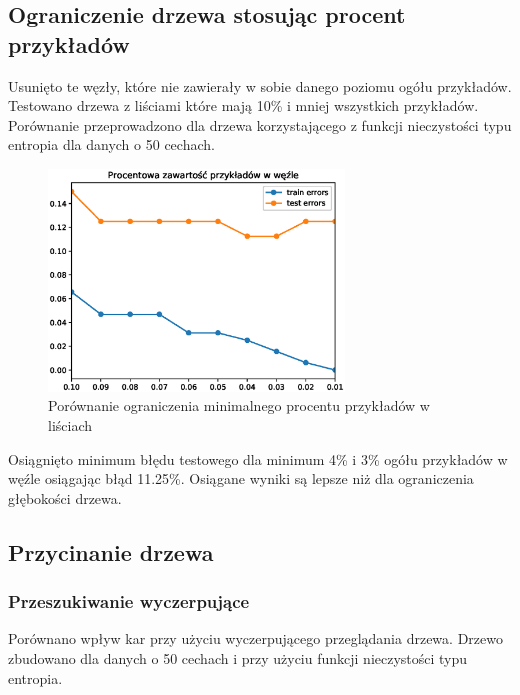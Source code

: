 \documentclass[11pt]{article}
\begin{document}
\subsection{Ograniczenie drzewa stosując procent przykładów}

Usunięto te węzły, które nie zawierały w sobie danego poziomu ogółu przykładów. Testowano drzewa z liściami które mają 10\% i mniej wszystkich przykładów. Porównanie przeprowadzono dla drzewa korzystającego z funkcji nieczystości typu entropia dla danych o 50 cechach.

\begin{figure}[H]
\center
\includegraphics[width=0.7\textwidth]{min_node_vals_test}
\caption{Porównanie ograniczenia minimalnego procentu przykładów w liściach}
\end{figure}

Osiągnięto minimum błędu testowego dla minimum 4\% i 3\% ogółu przykładów w węźle osiągając błąd 11.25\%. Osiągane wyniki są lepsze niż dla ograniczenia głębokości drzewa.

\subsection{Przycinanie drzewa}
\subsubsection{Przeszukiwanie wyczerpujące}

Porównano wpływ kar przy użyciu wyczerpującego przeglądania drzewa. Drzewo zbudowano dla danych o 50 cechach i przy użyciu funkcji nieczystości typu entropia.
\end{document}
